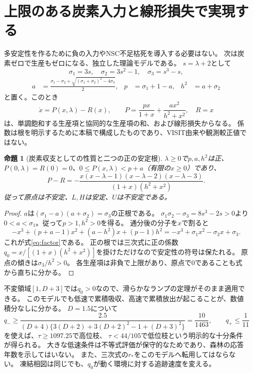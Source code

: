 \documentclass[a4paper,11pt]{ltjsarticle}
\newtheorem{proposition}{命題}
\begin{document}
\section{上限のある炭素入力と線形損失で実現する}
多安定性を作るために負の入力やNSC不足枯死を導入する必要はない。
次は炭素ゼロで生産もゼロになる、独立した理論モデルである。
$s=\lambda+2$として
\[
\sigma_1=3s,\quad \sigma_2=3s^2-1,\quad \sigma_3=s^3-s,
\]
\begin{align}
a&=\frac{\sigma_1-\sigma_2+
 \sqrt{(\sigma_1+\sigma_2)^2-4\sigma_3}}{2},&
p&=\sigma_1+1-a,& h^2&=a+\sigma_2
\end{align}
と置く。このとき
\begin{equation}
\boxed{\quad
\dot x=P(x,\lambda)-R(x),\qquad
P=\frac{p x}{1+x}+\frac{a x^2}{h^2+x^2},\quad R=x
\quad}
\label{eq:bounded}
\end{equation}
は、単調飽和する生産項と協同的な生産項の和、および線形損失からなる。
係数は根を明示するために本稿で構成したものであり、VISIT由来や観測較正値ではない。

\begin{proposition}[炭素収支としての性質と二つの正の安定根]
$\lambda\ge0$で$p,a,h^2$は正、
$P(0,\lambda)=R(0)=0$、$0\le P(x,\lambda)<p+a$（有限の$x\ge0$）であり、
\begin{equation}
P-R=-\frac{x(x-\lambda-1)(x-\lambda-2)(x-\lambda-3)}
              {(1+x)(h^2+x^2)}.
\label{eq:factor}
\end{equation}
従って原点は不安定、$L,H$は安定、$U$は不安定である。
\end{proposition}
\begin{proof}
$a$は$(\sigma_1-a)(a+\sigma_2)=\sigma_3$の正根である。
$\sigma_1\sigma_2-\sigma_3=8s^3-2s>0$より
$0<a<\sigma_1$。従って$p>1,h^2>0$を得る。
通分後の分子を$x$で割ると
\[
-x^3+(p+a-1)x^2+(a-h^2)x+(p-1)h^2
=-x^3+\sigma_1x^2-\sigma_2x+\sigma_3.
\]
これが式\eqref{eq:factor}である。
正の根では三次式に正の係数
$q_0=x/[(1+x)(h^2+x^2)]$を掛けただけなので安定性の符号は保たれる。
原点の傾きは$\sigma_3/h^2>0$。
各生産項は非負で上限があり、原点で0であることも式から直ちに分かる。
\end{proof}

不変領域$[1,D+3]$では$q_0>0$なので、滑らかなランプの定理がそのまま適用できる。
このモデルでも低速で累積吸収、高速で累積放出が起こることが、数値積分なしに分かる。
$D=1.5$について
\[
q_-\ge\frac{2.5}{(D+4)\{3(D+2)+3(D+2)^2-1+(D+3)^2\}}
=\frac{10}{1463},\qquad q_+\le\frac1{11}
\]
を使えば、$\tau\ge1097.25$で高位枝、
$\tau<44/105$で低位枝という明示的な十分条件が得られる。
大きな低速条件は不等式評価が保守的なためであり、森林の応答年数を示してはいない。
また、三次式の$r_*$をこのモデルへ転用してはならない。
凍結相図は同じでも、$q_0$が動く環境に対する追跡速度を変える。
\end{document}
